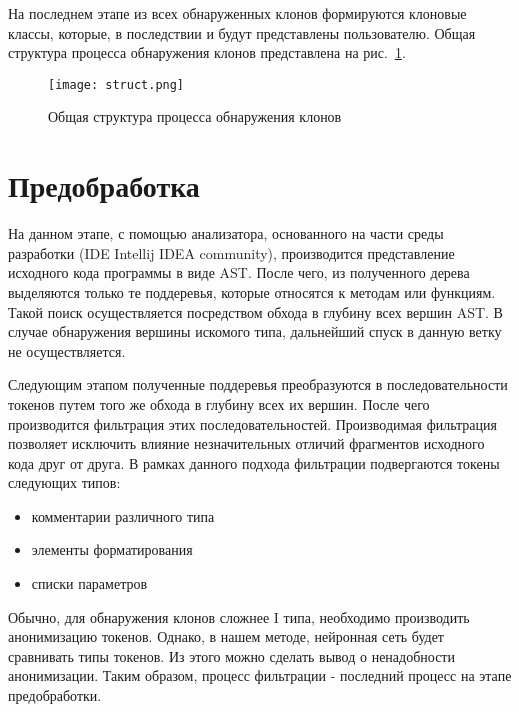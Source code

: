 На последнем этапе из всех обнаруженных клонов формируются клоновые классы, которые, в последствии и будут представлены пользователю. Общая структура процесса обнаружения клонов представлена на рис.~\ref{fig:struct}.

\begin{figure}[htbp]
\centering
\texttt{[image: struct.png]}
\caption{Общая структура процесса обнаружения клонов}
\label{fig:struct}
\end{figure}

\section{Предобработка}

На данном этапе, с помощью анализатора, основанного на части среды разработки (IDE Intellij IDEA community), производится представление исходного кода программы в виде AST. После чего, из полученного дерева выделяются только те поддеревья, которые относятся к методам или функциям. Такой поиск осуществляется посредством обхода в глубину всех вершин AST. В случае обнаружения вершины искомого типа, дальнейший спуск в данную ветку не осуществляется.


Следующим этапом полученные поддеревья преобразуются в последовательности токенов путем того же обхода в глубину всех их вершин. После чего производится фильтрация этих последовательностей. Производимая фильтрация позволяет исключить влияние незначительных отличий фрагментов исходного кода друг от друга. В рамках данного подхода фильтрации подвергаются токены следующих типов:
\begin{itemize}
\setlength\itemsep{0mm}
\item комментарии различного типа
\item элементы форматирования
\item списки параметров
\end{itemize}

Обычно, для обнаружения клонов сложнее I типа, необходимо производить анонимизацию токенов. Однако, в нашем методе, нейронная сеть будет сравнивать типы токенов. Из этого можно сделать вывод о ненадобности анонимизации. Таким образом, процесс фильтрации - последний процесс на этапе предобработки.

